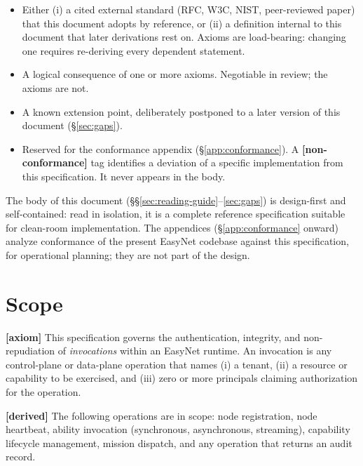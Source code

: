 \documentclass[11pt,a4paper]{article}
\newcommand{\axiom}{\textcolor{axiomcolor}{\textbf{[axiom]}}\xspace}
\newcommand{\derived}{\textcolor{derivedcolor}{\textbf{[derived]}}\xspace}
\newcommand{\deferred}{\textcolor{deferredcolor}{\textbf{[deferred]}}\xspace}
\newcommand{\defect}{\textcolor{defectcolor}{\textbf{[non-conformance]}}\xspace}
\begin{document}
\begin{itemize}[leftmargin=2.4em,itemsep=0.3em]
    \item[\axiom] Either (i) a cited external standard (RFC, W3C,
    NIST, peer-reviewed paper) that this document adopts by reference,
    or (ii) a definition internal to this document that later
    derivations rest on. Axioms are load-bearing: changing one requires
    re-deriving every dependent statement.

    \item[\derived] A logical consequence of one or more axioms.
    Negotiable in review; the axioms are not.

    \item[\deferred] A known extension point, deliberately postponed to
    a later version of this document (\S\ref{sec:gaps}).

    \item[\defect] Reserved for the conformance appendix
    (\S\ref{app:conformance}). A \defect tag identifies a deviation of a
    specific implementation from this specification. It never appears
    in the body.
\end{itemize}

\begin{notebox}
The body of this document (\S\S\ref{sec:reading-guide}--\ref{sec:gaps}) is
design-first and self-contained: read in isolation, it is a complete
reference specification suitable for clean-room implementation. The
appendices (\S\ref{app:conformance} onward) analyze conformance of the
present EasyNet codebase against this specification, for operational
planning; they are not part of the design.
\end{notebox}

\section{Scope}
\label{sec:scope}

\axiom{} This specification governs the authentication, integrity, and
non-repudiation of \emph{invocations} within an EasyNet runtime. An
invocation is any control-plane or data-plane operation that names
(i) a tenant, (ii) a resource or capability to be exercised, and
(iii) zero or more principals claiming authorization for the operation.

\derived{} The following operations are in scope: node registration,
node heartbeat, ability invocation (synchronous, asynchronous,
streaming), capability lifecycle management, mission dispatch, and any
operation that returns an audit record.
\end{document}
